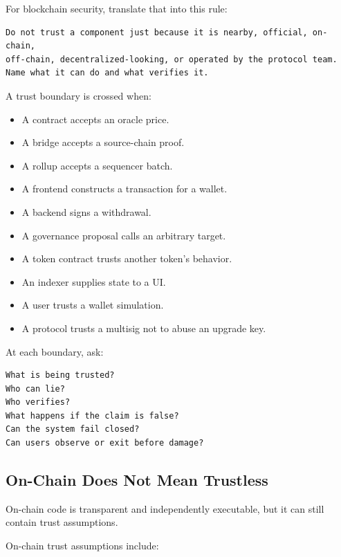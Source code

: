 For blockchain security, translate that into this rule:

\begin{lstlisting}
Do not trust a component just because it is nearby, official, on-chain,
off-chain, decentralized-looking, or operated by the protocol team.
Name what it can do and what verifies it.
\end{lstlisting}

A trust boundary is crossed when:

\begin{itemize}
\tightlist
\item
  A contract accepts an oracle price.
\item
  A bridge accepts a source-chain proof.
\item
  A rollup accepts a sequencer batch.
\item
  A frontend constructs a transaction for a wallet.
\item
  A backend signs a withdrawal.
\item
  A governance proposal calls an arbitrary target.
\item
  A token contract trusts another token's behavior.
\item
  An indexer supplies state to a UI.
\item
  A user trusts a wallet simulation.
\item
  A protocol trusts a multisig not to abuse an upgrade key.
\end{itemize}

At each boundary, ask:

\begin{lstlisting}
What is being trusted?
Who can lie?
Who verifies?
What happens if the claim is false?
Can the system fail closed?
Can users observe or exit before damage?
\end{lstlisting}

\subsection{On-Chain Does Not Mean Trustless}

On-chain code is transparent and independently executable, but it can
still contain trust assumptions.

On-chain trust assumptions include:

